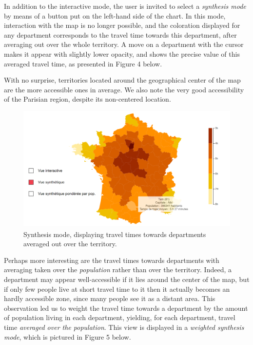 \documentclass{vgtc}                          %
\begin{document}
In addition to the interactive mode, the user is invited to select a \textit{synthesis mode} by means of a button put on the left-hand side of the chart. In this mode, interaction with the map is no longer possible, and the coloration displayed for any department corresponds to the travel time towards this department, after averaging out over the whole territory. A move on a department with the cursor makes it appear with slightly lower opacity, and shows the precise value of this averaged travel time, as presented in Figure 4 below.

With no surprise, territories located around the geographical center of the map are the more accessible ones in average. We also note the very good accessibility of the Parisian region, despite its non-centered location.







\begin{figure}[h]
 \centering %
 \includegraphics[scale=1, width=\columnwidth]{ImageProjet10_01_Bis.png}
 \caption{Synthesis mode, displaying travel times towards departments averaged out over the territory.}
 \label{fig:sample}
\end{figure}




Perhaps more interesting are the travel times towards departments with averaging taken over the \textit{population} rather than over the territory. Indeed, a department may appear well-accessible if it lies around the center of the map, but if only few people live at short travel time to it then it actually becomes an hardly accessible zone, since many people see it as a distant area. This observation led us to weight the travel time towards a department by the amount of population living in each department, yielding, for each department, travel time \textit{averaged over the population}. This view is displayed in a \textit{weighted synthesis mode}, which is pictured in Figure 5 below.
\end{document}
